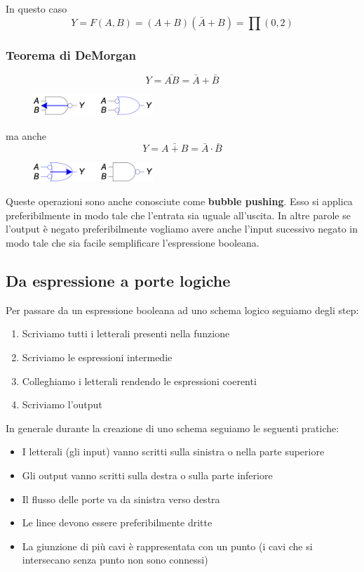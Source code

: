\documentclass[../main.tex]{subfiles}
\begin{document}
In questo caso
$$
    Y = F(A,B) = (A+B)(\bar{A}+B) = \prod(0,2)
$$

\pagebreak
\subsubsection{Teorema di DeMorgan}
$$
    Y = \bar{AB} = \bar{A} + \bar{B}
$$
\begin{figure}[h]
    \centering
    \includegraphics[width=0.4\textwidth]{images/bubbleBackward.png}
\end{figure}

ma anche
$$
    Y = \bar{A+B} = \bar{A} \cdot \bar{B}
$$
\begin{figure}[h]
    \centering
    \includegraphics[width=0.4\textwidth]{images/bubbleForward.png}
\end{figure}

Queste operazioni sono anche conosciute come \textbf{bubble pushing}. Esso si applica preferibilmente in modo tale che l'entrata 
sia uguale all'uscita. In altre parole se l'output è negato preferibilmente vogliamo avere anche l'input sucessivo negato in modo tale 
che sia facile semplificare l'espressione booleana.


\subsection{Da espressione a porte logiche}
Per passare da un espressione booleana ad uno schema logico seguiamo degli step:
\begin{enumerate}
    \item Scriviamo tutti i letterali presenti nella funzione
    \item Scriviamo le espressioni intermedie
    \item Colleghiamo i letterali rendendo le espressioni coerenti
    \item Scriviamo l'output
\end{enumerate}


In generale durante la creazione di uno schema seguiamo le seguenti pratiche:
\begin{itemize}
    \item I letterali (gli input) vanno scritti sulla sinistra o nella parte superiore
    \item Gli output vanno scritti sulla destra o sulla parte inferiore
    \item Il flusso delle porte va da sinistra verso destra
    \item Le linee devono essere preferibilmente dritte
    \item La giunzione di più cavi è rappresentata con un punto (i cavi che si intersecano senza punto non sono connessi)
\end{itemize}
\end{document}
